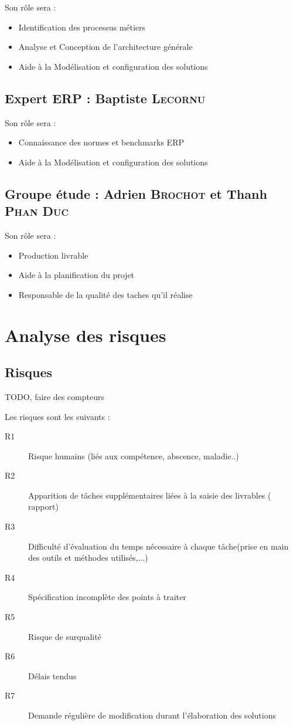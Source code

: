 Son rôle sera :
\begin{itemize}
    \item Identification des processus métiers
    \item Analyse et Conception de l’architecture générale
    \item Aide à la Modélisation et configuration des solutions 
\end{itemize}

\subsection{Expert ERP : Baptiste \textsc{Lecornu}}

Son rôle sera :
\begin{itemize}
    \item Connaissance des normes et benchmarks ERP
    \item Aide à la Modélisation et configuration des solutions 
\end{itemize}

\subsection{Groupe étude : Adrien \textsc{Brochot} et Thanh \textsc{Phan Duc}}

Son rôle sera :
\begin{itemize}
    \item Production livrable
    \item Aide à la planification du projet
    \item Responsable de la qualité des taches qu’il réalise
\end{itemize}


\section{Analyse des risques}
\subsection{Risques}

\huge{TODO, faire des compteurs}

Les risques sont les suivants :
\begin{description}
    \item[R1]{Risque humains (liés aux compétence, abscence, maladie..)}
    \item[R2]{Apparition de tâches supplémentaires liées à la saisie des livrables ( rapport)}
    \item[R3]{Difficulté d’évaluation du temps nécessaire à chaque tâche(prise en main des outils et méthodes utilisés,...)}
    \item[R4]{Spécification incomplète des points à traiter}
    \item[R5]{Risque de surqualité}
    \item[R6]{Délais tendus}
    \item[R7]{Demande régulière de modification durant l’élaboration des solutions}
\end{description}

